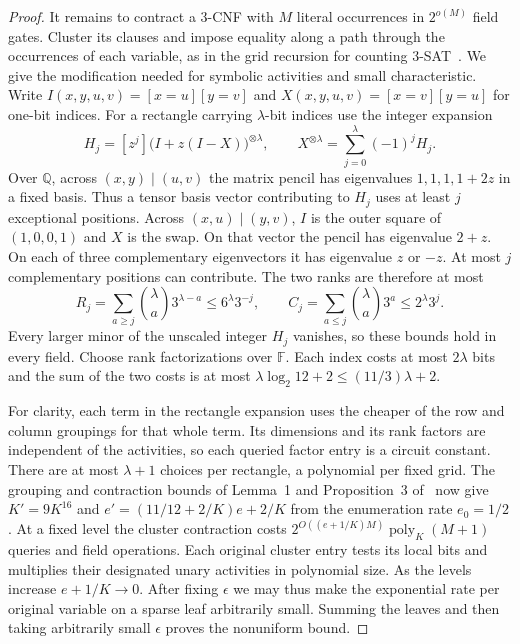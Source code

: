 \documentclass[11pt]{article}
\theoremstyle{definition}
\newcommand{\F}{\mathbb F}
\begin{document}
\begin{proof}
It remains to contract a \(3\)-CNF with \(M\) literal occurrences in \(2^{o(M)}\) field gates. Cluster its clauses and impose equality along a path through the occurrences of each variable, as in the grid recursion for counting \(3\)-SAT~\cite[Sections~3--6]{grid-sat}. We give the modification needed for symbolic activities and small characteristic. Write \(I(x,y,u,v)=[x=u][y=v]\) and \(X(x,y,u,v)=[x=v][y=u]\) for one-bit indices. For a rectangle carrying \(\lambda\)-bit indices use the integer expansion
\[
 H_j=[z^j]\bigl(I+z(I-X)\bigr)^{\otimes\lambda},\qquad
 X^{\otimes\lambda}=\sum_{j=0}^{\lambda}(-1)^jH_j .
\]
Over \(\mathbb Q\), across \((x,y)\mid(u,v)\) the matrix pencil has eigenvalues \(1,1,1,1+2z\) in a fixed basis. Thus a tensor basis vector contributing to \(H_j\) uses at least \(j\) exceptional positions. Across \((x,u)\mid(y,v)\), \(I\) is the outer square of \((1,0,0,1)\) and \(X\) is the swap. On that vector the pencil has eigenvalue \(2+z\). On each of three complementary eigenvectors it has eigenvalue \(z\) or \(-z\). At most \(j\) complementary positions can contribute. The two ranks are therefore at most
\[
 R_j=\sum_{a\ge j}\binom\lambda a3^{\lambda-a}\le6^\lambda3^{-j},
 \qquad C_j=\sum_{a\le j}\binom\lambda a3^a\le2^\lambda3^j .
\]
Every larger minor of the unscaled integer \(H_j\) vanishes, so these bounds hold in every field. Choose rank factorizations over \(\F\). Each index costs at most \(2\lambda\) bits and the sum of the two costs is at most \(\lambda\log_2 12+2\le(11/3)\lambda+2\).

For clarity, each term in the rectangle expansion uses the cheaper of the row and column groupings for that whole term. Its dimensions and its rank factors are independent of the activities, so each queried factor entry is a circuit constant. There are at most \(\lambda+1\) choices per rectangle, a polynomial per fixed grid. The grouping and contraction bounds of Lemma~1 and Proposition~3 of~\cite{grid-sat} now give \(K'=9K^{16}\) and \(e'=(11/12+2/K)e+2/K\) from the enumeration rate \(e_0=1/2\). At a fixed level the cluster contraction costs \(2^{O((e+1/K)M)}\operatorname{poly}_K(M+1)\) queries and field operations. Each original cluster entry tests its local bits and multiplies their designated unary activities in polynomial size. As the levels increase \(e+1/K\to0\). After fixing \(\epsilon\) we may thus make the exponential rate per original variable on a sparse leaf arbitrarily small. Summing the leaves and then taking arbitrarily small \(\epsilon\) proves the nonuniform bound.
\end{proof}
\end{document}
